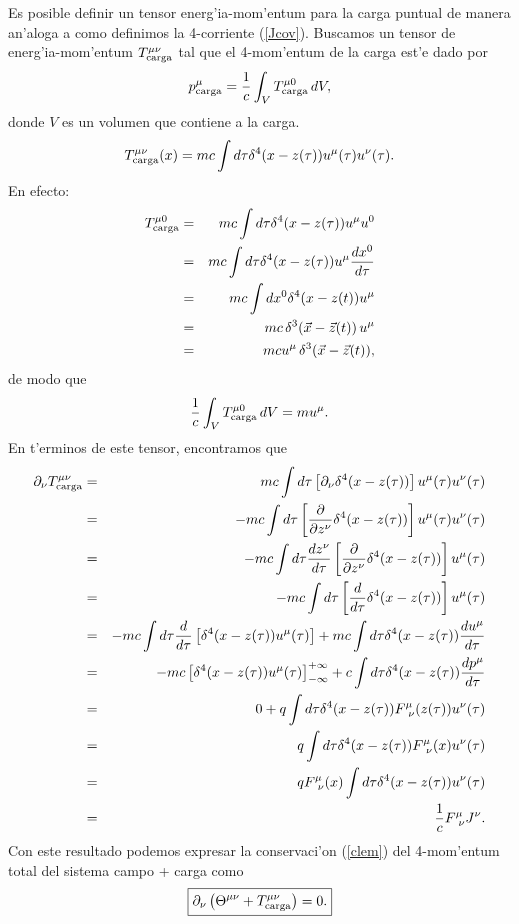Es posible definir un tensor energ'ia-mom'entum para la carga puntual de manera
an'aloga a como definimos la 4-corriente (\ref{Jcov}). Buscamos un tensor de
energ'ia-mom'entum $T_{\rm carga}^{\mu\nu}$ tal que el 4-mom'entum de la carga
est'e dado por
\begin{equation}
p^\mu_{\rm carga}=\frac{1}{c}\int_V T_{\rm carga}^{\mu 0}\,dV,
\end{equation}
donde $V$ es un volumen que contiene a la carga.
\begin{equation}
T_{\rm carga}^{\mu\nu}(x)=mc\int d\tau \delta^4(x-z(\tau)) u^\mu(\tau)
u^\nu(\tau).
\end{equation}
En efecto:
\begin{eqnarray}
T_{\rm carga}^{\mu 0}&=&mc\int d\tau \delta^4(x-z(\tau)) u^\mu u^0 \\
&=&mc\int d\tau \delta^4(x-z(\tau)) u^\mu \frac{dx^0}{d\tau} \\
&=&mc\int dx^0 \delta^4(x-z(t)) u^\mu  \\
&=&mc\,\delta^3(\vec{x}-\vec{z}(t))\, u^\mu \\
&=&mc u^\mu \, \delta^3(\vec{x}-\vec{z}(t)),
\end{eqnarray}
de modo que
\begin{equation}
\frac{1}{c}\int_V T_{\rm carga}^{\mu 0}\,dV=m u^\mu.
\end{equation}
En t'erminos de este tensor, encontramos que
\begin{eqnarray}
\partial_\nu T_{\rm carga}^{\mu\nu}&=&mc\int d\tau \left[ \partial_\nu
\delta^4(x-z(\tau))\right]  u^\mu(\tau) u^\nu(\tau) \\
&=&-mc\int d\tau \left[ \frac{\partial}{\partial z^\nu}
\delta^4(x-z(\tau))\right]  u^\mu(\tau)u^\nu(\tau) \\
&=&-mc\int d\tau \frac{dz^\nu}{d\tau}\left[ \frac{\partial}{\partial z^\nu}
\delta^4(x-z(\tau))\right]  u^\mu(\tau)\\
&=&-mc\int d\tau \left[\frac{d}{d\tau}\delta^4(x-z(\tau))\right]  u^\mu(\tau)\\
&=&-mc\int d\tau  \frac{d}{d\tau}\left[\delta^4(x-z(\tau))
u^\mu(\tau)\right]+mc\int d\tau  \delta^4(x-z(\tau)) \frac{du^\mu}{d\tau}\\
&=&-mc\left[\delta^4(x-z(\tau)) u^\mu(\tau)\right]^{+\infty}_{-\infty}+c\int
d\tau  \delta^4(x-z(\tau)) \frac{dp^\mu}{d\tau}\\
&=&0+q\int d\tau  \delta^4(x-z(\tau))F^\mu_{\ \nu}(z(\tau))u^\nu(\tau)\\
&=&q\int d\tau  \delta^4(x-z(\tau))F^\mu_{\ \nu}(x)u^\nu(\tau)\\
&=&qF^\mu_{\ \nu}(x)\int d\tau  \delta^4(x-z(\tau))u^\nu(\tau)\\
&=&\frac{1}{c}F^\mu_{\ \nu}J^\nu.
\end{eqnarray}
Con este resultado podemos expresar la conservaci'on (\ref{clem}) del 4-mom'entum
total del sistema campo + carga como
\begin{equation}
\boxed{\partial_\nu \left( \Theta^{\mu\nu}+T_{\rm carga}^{\mu\nu}\right) =0.}
\label{clem2}
\end{equation}
